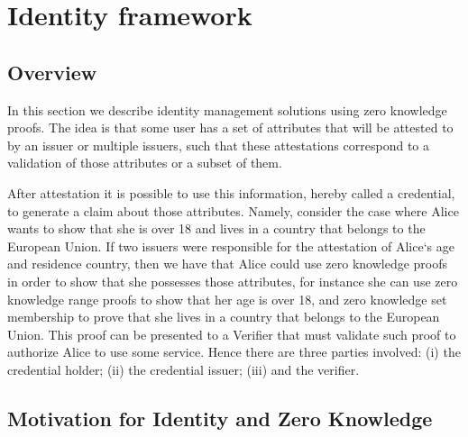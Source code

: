 \section{Identity framework}
\label{apps:id-framework}



\subsection{Overview}
\label{sec:apps:id-framework:overview}


In this section we describe identity management solutions using zero knowledge proofs. The idea is that some user has a set of attributes that will be attested to by an issuer or multiple issuers, such that these attestations correspond to a validation of those attributes or a subset of them. 


After attestation it is possible to use this information, hereby called a credential, to generate a claim about those attributes. Namely, consider the case where Alice wants to show that she is over 18 and lives in a country that belongs to the European Union. If two issuers were responsible for the attestation of Alice`s age and residence country, then we have that Alice could use zero knowledge proofs in order to show that she possesses those attributes, for instance she can use zero knowledge range proofs to show that her age is over 18, and zero knowledge set membership to prove that she lives in a country that belongs to the European Union. This proof can be presented to a Verifier that must validate such proof to authorize Alice to use some service. Hence there are three parties involved: (i) the credential holder; (ii) the credential issuer; (iii) and the verifier.  

  


\subsection{Motivation for Identity and Zero Knowledge}
\label{sec:apps:id-framework:motivation}

